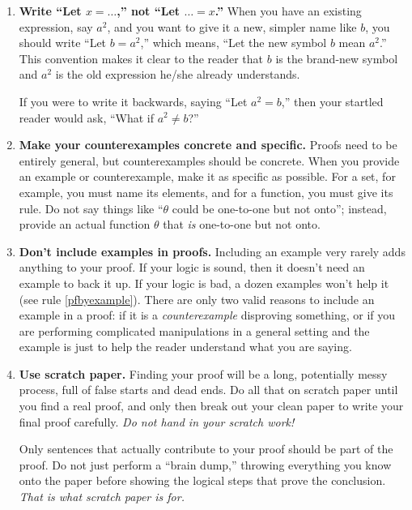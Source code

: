 \begin{enumerate}
\item \textbf{Write ``Let $x=\dots$,'' not ``Let $\dots=x$.''} 
	When you have an existing expression, say $a^{2}$,
	and you want to give it a new, simpler name like $b$,
	you should write ``Let $b=a^{2}$,''
	which means, ``Let the new symbol $b$ mean $a^{2}$.''
	This convention makes it clear to the reader that $b$ is the brand-new symbol
	and $a^{2}$ is the old expression he/she already understands.
	
	If you were to write it backwards, saying ``Let $a^{2}=b$,''
	then your startled reader would ask,
	``What if $a^{2}\neq b$?''
  
\item \textbf{Make your counterexamples concrete and specific.}
	Proofs need to be entirely general,
	but counterexamples should be concrete.
	When you provide an example or counterexample,
	make it as specific as possible.
	For a set, for example, you must name its elements,
	and for a function, you must give its rule.
	Do not say things like ``$\theta$ could be one-to-one but not onto'';
	instead, provide an actual function $\theta$ that \emph{is} one-to-one but not onto.
    
\item \textbf{Don't include examples in proofs.}
	Including an example very rarely adds anything to your proof.
	If your logic is sound, then it doesn't need an example to back it up.
	If your logic is bad, a dozen examples won't help it (see rule \ref{pfbyexample}).
	There are only two valid reasons to include an example in a proof:
	if it is a \emph{counterexample} disproving something,
	or if you are performing complicated manipulations in a general setting
	and the example is just to help the reader understand what you are saying.

 \item \textbf{Use scratch paper.}
	Finding your proof will be a long, potentially messy process, 
	full of false starts and dead ends.
	Do all that on scratch paper
	until you find a real proof,
	and only then break out your clean paper to write your final proof carefully.
	\emph{Do not hand in your scratch work!}
	
	Only sentences that actually contribute to your proof 
	should be part of the proof.
	Do not just perform a ``brain dump,''
	throwing everything you know onto the paper
	before showing the logical steps that prove the conclusion.
	\emph{That is what scratch paper is for.}

\end{enumerate}
